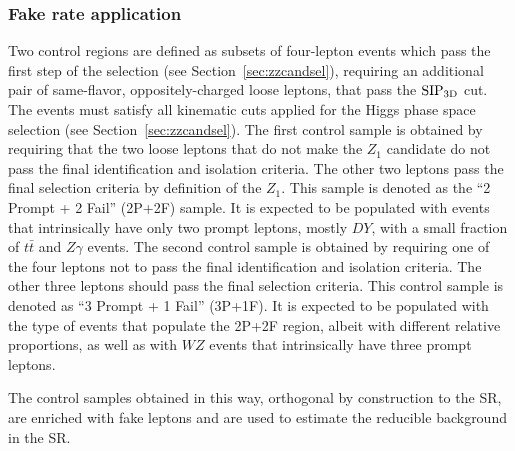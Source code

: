 


\subsubsection{Fake rate application}
\label{sec:zxA}

Two control regions are defined as subsets of four-lepton events
which pass the first step of the selection (see
Section~\ref{sec:zzcandsel}), requiring an additional pair of 
same-flavor, oppositely-charged loose leptons, that pass the ${\rm SIP_{3D}}$ cut. 
The events must satisfy all kinematic cuts applied for the Higgs phase space selection
(see Section~\ref{sec:zzcandsel}).
The first control sample is obtained by
requiring that the two loose leptons that do not make the $Z_1$ candidate 
do not pass the final identification and
isolation criteria.
The other two leptons pass
the final selection criteria by definition of the $Z_1$. 
This sample is denoted as the ``2 Prompt + 2
Fail'' (2P+2F) sample. It is expected to be populated with
events that intrinsically have only two prompt leptons, mostly $DY$, with a small fraction of $t \bar{t}$ and $Z \gamma$ events.
The second control sample is obtained by requiring one of
the four leptons not to pass the final identification and isolation
criteria.
The other three
leptons should pass the final selection criteria. This control sample
is denoted as ``3 Prompt + 1 Fail'' (3P+1F). It is
expected to be populated with the type of events that populate the
2P+2F region, 
albeit with different relative proportions,
as well as with $WZ$ events that intrinsically have three
prompt leptons.

The control samples obtained in this way, orthogonal by construction
to the SR, are enriched with fake leptons and are used to
estimate the reducible background in the SR. 

